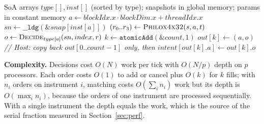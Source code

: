 \begin{algorithm}[t]
\caption{CUDA decision kernel with compaction}
\label{alg:kernel}
\footnotesize
\begin{algorithmic}[1]
\Require SoA arrays $type[], inst[]$ (sorted by type); snapshots in global memory; params in constant memory
\State $a \gets blockIdx.x \cdot blockDim.x + threadIdx.x$
 \Return \EndIf
\State $sn \gets \texttt{\_\_ldg}(\&snap[inst[a]])$ 
\State $(r_0..r_3) \gets \textsc{Philox4x32}(s, a, t)$ 
\State $o \gets \textsc{Decide}_{type[a]}(sn, index, r)$ 
  \State $k \gets \texttt{atomicAdd}(\&count, 1)$
  \State $out[k] \gets (a, o)$ 
\EndIf
\State \textit{// Host: copy back $out[0..count-1]$ only, then $intent[out[k].a] \gets out[k].o$}
\end{algorithmic}
\end{algorithm}

\textbf{Complexity.} Decisions cost $O(N)$ work per tick with $O(N/p)$ depth on $p$ processors.
Each order costs $O(1)$ to add or cancel plus $O(k)$ for $k$ fills; with $n_i$ orders on instrument
$i$, matching costs $O(\sum_i n_i)$ work but its depth is $O(\max_i n_i)$, because the orders of
one instrument are processed sequentially. With a single instrument the depth equals the work,
which is the source of the serial fraction measured in Section~\ref{sec:perf}.
